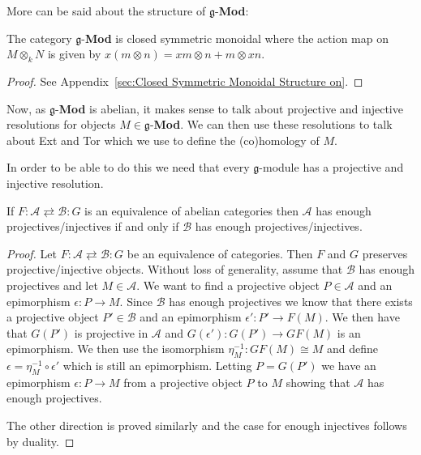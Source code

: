 More can be said about the structure of $ \mathfrak{g} $-\textbf{Mod}:
\begin{proposition}
  \label{prop:monoidal}
  The category $ \mathfrak{g} $-\textbf{Mod} is closed symmetric monoidal where the action map on $ M \otimes_k N $ is given by $ x(m \otimes n) = xm\otimes n + m\otimes xn $.
\end{proposition}
\begin{proof}
  See Appendix~\ref{sec:Closed Symmetric Monoidal Structure on}.
\end{proof}

Now, as $ \mathfrak{g} $-\textbf{Mod} is abelian, it makes sense to talk about projective and injective resolutions for objects $ M \in \mathfrak{g} $-\textbf{Mod}. We can then use these resolutions to talk about Ext and Tor which we use to define the (co)homology of $ M $.

In order to be able to do this we need that every $ \mathfrak{g} $-module has a projective and injective resolution.
\begin{lemma}
  \label{lem:eqcat}
  If $ F:\mathcal{A} \rightleftarrows \mathcal{B}: G $ is an equivalence of abelian categories then $ \mathcal{A} $ has enough projectives/injectives if and only if $ \mathcal{B} $ has enough projectives/injectives.
\end{lemma}
\begin{proof}
  Let $ F:\mathcal{A} \rightleftarrows \mathcal{B}:G $ be an equivalence of categories. Then $ F $ and $ G $ preserves projective/injective objects. Without loss of generality, assume that $ \mathcal{B} $ has enough projectives and let $ M \in \mathcal{A} $. We want to find a projective object $ P \in \mathcal{A} $ and an epimorphism $ \epsilon: P \to M $. Since $ \mathcal{B} $ has enough projectives we know that there exists a projective object $ P' \in \mathcal{B} $ and an epimorphism $ \epsilon': P' \to F(M) $. We then have that $ G(P') $ is projective in $ \mathcal{A} $ and $ G(\epsilon'):G(P') \to GF(M) $ is an epimorphism. We then use the isomorphism $ \eta_M^{-1}:GF(M) \cong M $ and define $ \epsilon = \eta_M^{-1} \circ \epsilon' $ which is still an epimorphism. Letting $ P = G(P') $ we have an epimorphism $ \epsilon: P \to M $ from a projective object $ P $ to $ M $ showing that $ \mathcal{A} $ has enough projectives.

  The other direction is proved similarly and the case for enough injectives follows by duality.
\end{proof}

